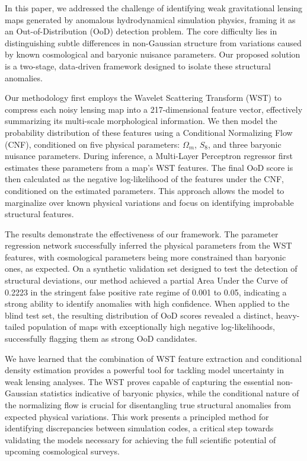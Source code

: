 \documentclass[]{article}
\begin{document}
In this paper, we addressed the challenge of identifying weak gravitational lensing maps generated by anomalous hydrodynamical simulation physics, framing it as an Out-of-Distribution (OoD) detection problem. The core difficulty lies in distinguishing subtle differences in non-Gaussian structure from variations caused by known cosmological and baryonic nuisance parameters. Our proposed solution is a two-stage, data-driven framework designed to isolate these structural anomalies.

Our methodology first employs the Wavelet Scattering Transform (WST) to compress each noisy lensing map into a 217-dimensional feature vector, effectively summarizing its multi-scale morphological information. We then model the probability distribution of these features using a Conditional Normalizing Flow (CNF), conditioned on five physical parameters: $\Omega_m$, $S_8$, and three baryonic nuisance parameters. During inference, a Multi-Layer Perceptron regressor first estimates these parameters from a map's WST features. The final OoD score is then calculated as the negative log-likelihood of the features under the CNF, conditioned on the estimated parameters. This approach allows the model to marginalize over known physical variations and focus on identifying improbable structural features.

The results demonstrate the effectiveness of our framework. The parameter regression network successfully inferred the physical parameters from the WST features, with cosmological parameters being more constrained than baryonic ones, as expected. On a synthetic validation set designed to test the detection of structural deviations, our method achieved a partial Area Under the Curve of 0.2223 in the stringent false positive rate regime of 0.001 to 0.05, indicating a strong ability to identify anomalies with high confidence. When applied to the blind test set, the resulting distribution of OoD scores revealed a distinct, heavy-tailed population of maps with exceptionally high negative log-likelihoods, successfully flagging them as strong OoD candidates.

We have learned that the combination of WST feature extraction and conditional density estimation provides a powerful tool for tackling model uncertainty in weak lensing analyses. The WST proves capable of capturing the essential non-Gaussian statistics indicative of baryonic physics, while the conditional nature of the normalizing flow is crucial for disentangling true structural anomalies from expected physical variations. This work presents a principled method for identifying discrepancies between simulation codes, a critical step towards validating the models necessary for achieving the full scientific potential of upcoming cosmological surveys.
\end{document}
